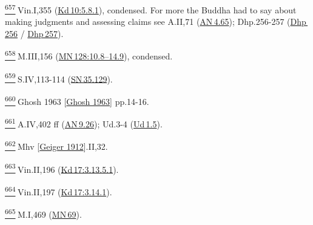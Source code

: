 \label{footprints_split_025.html_fn657}
\hyperref[footprints_split_016.htmlux5cux23fnref657]{\textsuperscript{657}} Vin.I,355
(\href{https://suttacentral.net/pli-tv-kd10/en/brahmali\#5.8.1}{Kd\,10:5.8.1}),
condensed. For more the Buddha had to say about making judgments and
assessing claims see A.II,71
(\href{https://suttacentral.net/an4.65/en/sujato}{AN\,4.65});
Dhp.256-257 (\href{https://suttacentral.net/dhp256/en/sujato}{Dhp\,256}
/ \href{https://suttacentral.net/dhp257/en/sujato}{Dhp\,257}).

\label{footprints_split_025.html_fn658}
\hyperref[footprints_split_016.htmlux5cux23fnref658]{\textsuperscript{658}} M.III,156
(\href{https://suttacentral.net/mn128/en/sujato\#10.8}{MN\,128:10.8--14.9}),
condensed.

\label{footprints_split_025.html_fn659}
\hyperref[footprints_split_016.htmlux5cux23fnref659]{\textsuperscript{659}} S.IV,113-114
(\href{https://suttacentral.net/sn35.129/en/sujato}{SN\,35.129}).

\label{footprints_split_025.html_fn660}
\hyperref[footprints_split_016.htmlux5cux23fnref660]{\textsuperscript{660}} {Ghosh
1963
{{[}\hyperref[footprints_split_022.htmlux5cux23Ghoshux5cux25201963]{Ghosh
1963}{]}}} pp.14-16.

\label{footprints_split_025.html_fn661}
\hyperref[footprints_split_016.htmlux5cux23fnref661]{\textsuperscript{661}} A.IV,402
ff (\href{https://suttacentral.net/an9.26/en/sujato}{AN\,9.26}); Ud.3-4
(\href{https://suttacentral.net/ud1.5/en/sujato}{Ud\,1.5}).

\label{footprints_split_025.html_fn662}
\hyperref[footprints_split_016.htmlux5cux23fnref662]{\textsuperscript{662}} {Mhv
{{[}\hyperref[footprints_split_023.htmlux5cux23Geigerux5cux25201912]{Geiger
1912}{]}}}.II,32.

\label{footprints_split_025.html_fn663}
\hyperref[footprints_split_016.htmlux5cux23fnref663]{\textsuperscript{663}} Vin.II,196
(\href{https://suttacentral.net/pli-tv-kd17/en/brahmali\#3.13.5.1}{Kd\,17:3.13.5.1}).

\label{footprints_split_025.html_fn664}
\hyperref[footprints_split_016.htmlux5cux23fnref664]{\textsuperscript{664}} Vin.II,197
(\href{https://suttacentral.net/pli-tv-kd17/en/brahmali\#3.14.1}{Kd\,17:3.14.1}).

\label{footprints_split_025.html_fn665}
\hyperref[footprints_split_016.htmlux5cux23fnref665]{\textsuperscript{665}} M.I,469
(\href{https://suttacentral.net/mn69/en/sujato}{MN\,69}).

